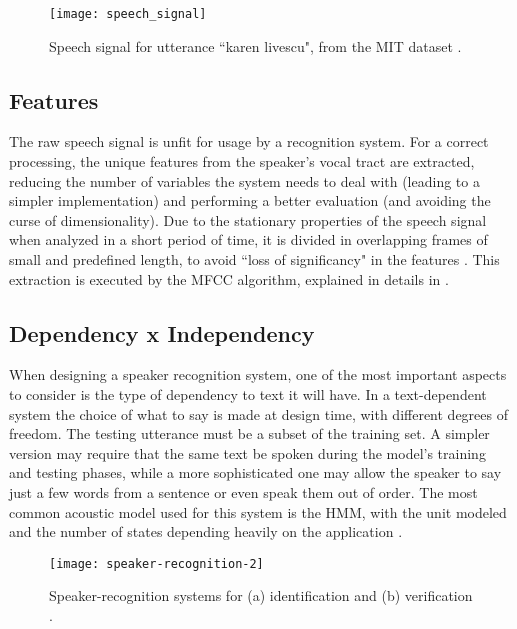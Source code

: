 \begin{figure}[ht]
    \centering
    \texttt{[image: speech\_signal]}
    \caption{Speech signal for utterance ``karen livescu", from the MIT dataset \cite{woo.park.hazen.2006}.}
    \label{fig:speech_signal}
\end{figure}

\subsection{Features}

The raw speech signal is unfit for usage by a recognition system. For a correct processing, the unique features from the speaker's vocal tract are extracted, reducing the number of variables the system needs to deal with (leading to a simpler implementation) and performing a better evaluation (and avoiding the curse of dimensionality). Due to the stationary properties of the speech signal when analyzed in a short period of time, it is divided in overlapping frames of small and predefined length, to avoid ``loss of significancy" in the features \cite{davis.mermelstein.1980, rabiner.schafer.2007}. This extraction is executed by the MFCC algorithm, explained in details in .

\subsection{Dependency x Independency}

When designing a speaker recognition system, one of the most important aspects to consider is the type of dependency to text it will have. In a text-dependent system the choice of what to say is made at design time, with different degrees of freedom. The testing utterance must be a subset of the training set. A simpler version may require that the same text be spoken during the model's training and testing phases, while a more sophisticated one may allow the speaker to say just a few words from a sentence or even speak them out of order. The most common acoustic model used for this system is the HMM, with the unit modeled and the number of states depending heavily on the application \cite{hebert.2008}.

\begin{figure}[ht]
    \centering
    \texttt{[image: speaker-recognition-2]}
    \caption{Speaker-recognition systems for (a) identification and (b) verification \cite{reynolds.1995a}.}
    \label{fig:speaker-recognition-2}
\end{figure}

